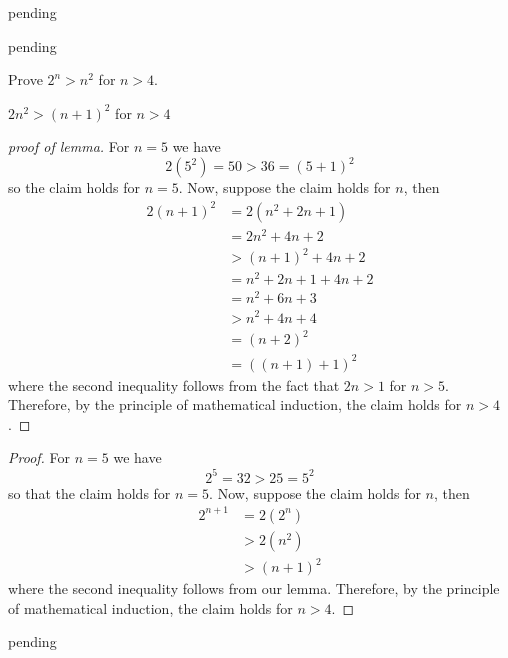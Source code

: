 \begin{exercise} \label{0.92}
	pending
\end{exercise}

\begin{exercise} \label{0.93}
	pending
\end{exercise}

\begin{exercise} \label{0.94}
	Prove \( 2^n > n^2 \) for \( n > 4 \).
	\begin{lemma}
	    \( 2n^2 > (n+1)^2 \) for \( n > 4 \)
	\end{lemma}
	\begin{proof}[proof of lemma]
	    For \( n = 5 \) we have
	    \[ 2(5^2) = 50 > 36 = (5+1)^2 \]
	    so the claim holds for \( n = 5 \). Now, suppose the claim holds for \( n \), then
	    \begin{align*}
	        2(n+1)^2 &= 2(n^2+2n+1) \\
	        &= 2n^2 + 4n + 2 \\
	        &> (n+1)^2 + 4n + 2 \\
	        &= n^2 + 2n + 1 + 4n + 2 \\
	        &= n^2 + 6n + 3 \\
	        &> n^2 + 4n + 4 \\
	        &= (n+2)^2 \\
	        &= ((n+1)+1)^2
	    \end{align*}
	    where the second inequality follows from the fact that \( 2n > 1 \) for \( n > 5 \). Therefore, by the principle of mathematical induction, the claim holds for \( n > 4 \).
	\end{proof}
	
	\begin{proof}
	    For \( n = 5 \) we have
	    \[ 2^5 = 32 > 25 = 5^2 \]
	    so that the claim holds for \( n = 5 \). Now, suppose the claim holds for \( n \), then
	    \begin{align*}
	        2^{n+1} &= 2(2^n) \\
	        &> 2(n^2) \\
	        &> (n+1)^2
	    \end{align*}
	    where the second inequality follows from our lemma. Therefore, by the principle of mathematical induction, the claim holds for \( n > 4 \).
	\end{proof}
\end{exercise}

\begin{exercise} \label{0.95}
	pending
\end{exercise}


